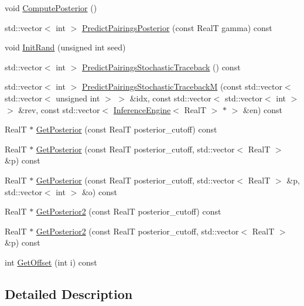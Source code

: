 \begin{DoxyCompactItemize}
void \hyperlink{class_inference_engine_aef03cd26f3758cfff297703bb37b5e9f}{Compute\+Posterior} ()
\item 
std\+::vector$<$ int $>$ \hyperlink{class_inference_engine_a11dda913fd2fd805a5262b662f53903f}{Predict\+Pairings\+Posterior} (const Real\+T gamma) const 
\item 
void \hyperlink{class_inference_engine_a1d4f39be3bdae1bc9e10e2e6c5c92958}{Init\+Rand} (unsigned int seed)
\item 
std\+::vector$<$ int $>$ \hyperlink{class_inference_engine_a0dd5cd1e780cf45b9f8cbe425f8cd924}{Predict\+Pairings\+Stochastic\+Traceback} () const 
\item 
std\+::vector$<$ int $>$ \hyperlink{class_inference_engine_aeb97e13498894ed68d38ab298bb8cbc9}{Predict\+Pairings\+Stochastic\+Traceback\+M} (const std\+::vector$<$ std\+::vector$<$ unsigned int $>$ $>$ \&idx, const std\+::vector$<$ std\+::vector$<$ int $>$ $>$ \&rev, const std\+::vector$<$ \hyperlink{class_inference_engine}{Inference\+Engine}$<$ Real\+T $>$ $\ast$ $>$ \&en) const 
\item 
Real\+T $\ast$ \hyperlink{class_inference_engine_ac554dcc770a4a700726ca26ae499b2da}{Get\+Posterior} (const Real\+T posterior\+\_\+cutoff) const 
\item 
Real\+T $\ast$ \hyperlink{class_inference_engine_acd84174fb4e866c3d83cdc43484ac6c8}{Get\+Posterior} (const Real\+T posterior\+\_\+cutoff, std\+::vector$<$ Real\+T $>$ \&p) const 
\item 
Real\+T $\ast$ \hyperlink{class_inference_engine_abdc92a839529f9075eb8220ab00e5152}{Get\+Posterior} (const Real\+T posterior\+\_\+cutoff, std\+::vector$<$ Real\+T $>$ \&p, std\+::vector$<$ int $>$ \&o) const 
\item 
Real\+T $\ast$ \hyperlink{class_inference_engine_a6d8d2be0e035900e7d9ee0f68eedfb06}{Get\+Posterior2} (const Real\+T posterior\+\_\+cutoff) const 
\item 
Real\+T $\ast$ \hyperlink{class_inference_engine_a09efab11b1a1e44813785ed23cda914e}{Get\+Posterior2} (const Real\+T posterior\+\_\+cutoff, std\+::vector$<$ Real\+T $>$ \&p) const 
\item 
int \hyperlink{class_inference_engine_ab696518de694f07a25b5c5af4ba66312}{Get\+Offset} (int i) const 
\end{DoxyCompactItemize}


\subsection{Detailed Description}
